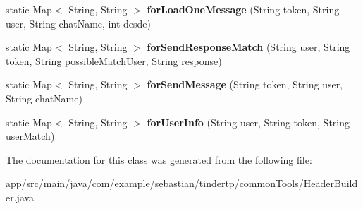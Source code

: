\begin{DoxyCompactItemize}
\item 
static Map$<$ String, String $>$ {\bfseries for\+Load\+One\+Message} (String token, String user, String chat\+Name, int desde)\hypertarget{classcom_1_1example_1_1sebastian_1_1tindertp_1_1commonTools_1_1HeaderBuilder_ac5e976c907fa229b441472fad5b7002b}{}\label{classcom_1_1example_1_1sebastian_1_1tindertp_1_1commonTools_1_1HeaderBuilder_ac5e976c907fa229b441472fad5b7002b}

\item 
static Map$<$ String, String $>$ {\bfseries for\+Send\+Response\+Match} (String user, String token, String possible\+Match\+User, String response)\hypertarget{classcom_1_1example_1_1sebastian_1_1tindertp_1_1commonTools_1_1HeaderBuilder_ab1bed209b1c5b07682055b743b88a879}{}\label{classcom_1_1example_1_1sebastian_1_1tindertp_1_1commonTools_1_1HeaderBuilder_ab1bed209b1c5b07682055b743b88a879}

\item 
static Map$<$ String, String $>$ {\bfseries for\+Send\+Message} (String token, String user, String chat\+Name)\hypertarget{classcom_1_1example_1_1sebastian_1_1tindertp_1_1commonTools_1_1HeaderBuilder_a3af3ce0574fc469716faed5f89283712}{}\label{classcom_1_1example_1_1sebastian_1_1tindertp_1_1commonTools_1_1HeaderBuilder_a3af3ce0574fc469716faed5f89283712}

\item 
static Map$<$ String, String $>$ {\bfseries for\+User\+Info} (String user, String token, String user\+Match)\hypertarget{classcom_1_1example_1_1sebastian_1_1tindertp_1_1commonTools_1_1HeaderBuilder_a056721d432a0768b1ef5611203004b90}{}\label{classcom_1_1example_1_1sebastian_1_1tindertp_1_1commonTools_1_1HeaderBuilder_a056721d432a0768b1ef5611203004b90}

\end{DoxyCompactItemize}


The documentation for this class was generated from the following file\+:\begin{DoxyCompactItemize}
\item 
app/src/main/java/com/example/sebastian/tindertp/common\+Tools/Header\+Builder.\+java\end{DoxyCompactItemize}
